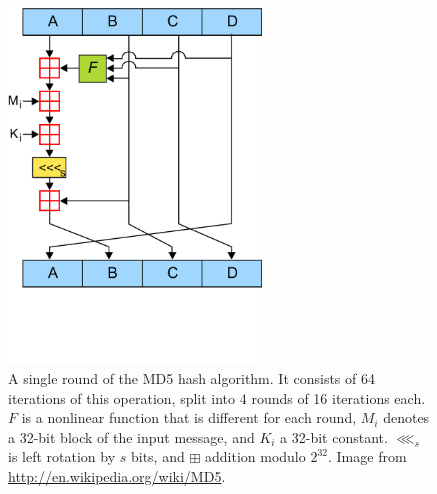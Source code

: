 \begin{figure}
    \centering
    \includegraphics[width=0.6\textwidth]{images/sec-6/MD5/MD5}
    \caption[A single round of the MD5 hash algorithm]{A single round of the MD5
        hash algorithm. It consists of 64 iterations of this operation, split
        into 4 rounds of 16 iterations each. $F$ is a nonlinear function that is
        different for each round, $M_i$ denotes a 32-bit block of the input
        message, and $K_i$ a 32-bit constant. $\lll_s$ is left rotation by $s$
        bits, and $\boxplus$ addition modulo $2^{32}$. Image from
        \url{http://en.wikipedia.org/wiki/MD5}.}
    \label{fig:md5_round}
\end{figure}


